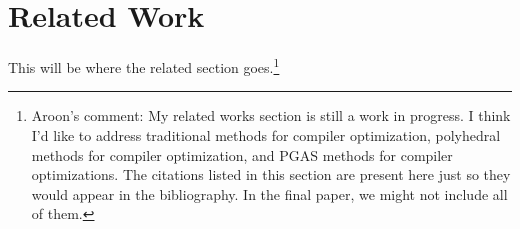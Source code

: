 \section{Related Work}\label{sec:relwork}

This will be where the related section goes.\footnote{Aroon's comment: My related works section is still a work in progress. I think I'd like to address traditional methods for compiler optimization, polyhedral methods for compiler optimization, and PGAS methods for compiler optimizations. The citations listed in this section are present here just so they would appear in the bibliography. In the final paper, we might not include all of them.}

\cite{callahan1988compiling}
\cite{chamberlain1998zpl}
\cite{chamberlain1997factor}
\cite{chavarria2005effective}
\cite{davidson1995improving}
\cite{Dion96compilingaffine}
\cite{germain1995automatic}
\cite{Gupta91automaticdata}
\cite{gupta1996compiling}
\cite{huang1994speculative}
\cite{iancu2008performance}
\cite{li1991data}
\cite{pouchet2011loop}
\cite{ramanujam1991compile}
\cite{shih2000efficient}
\cite{trifunovic2010graphite}
\cite{wei1998compiling}
\cite{chamberlain2011user}
\cite{bonachea2007proposal}
\cite{sanz2012global}